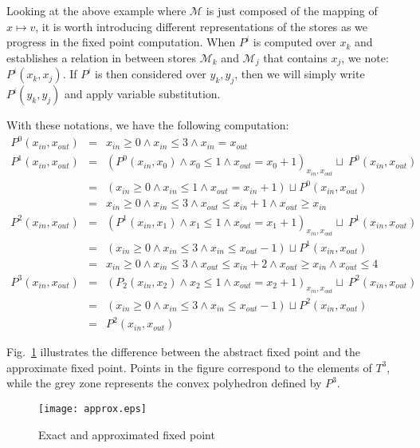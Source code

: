 \documentclass[submission,copyright,creativecommons]{eptcs}
\newcommand{\M}{\mathcal{M}}
\begin{document}
\noindent
Looking at the above example where $\M$ is just composed of the mapping of $x \mapsto v$, 
it is worth introducing different representations of the stores as we progress in the fixed point computation. 
When $P^i$ is computed over $x_k$ and establishes a relation in between stores $\M_k$ and $\M_j$ that contains $x_j$, we note: $P^i(x_k,x_j)$. If $P^i$ is then
considered over $y_k,y_j$, then we will simply write $P^i(y_k,y_j)$ and apply variable substitution. 

\noindent
With these notations, we have the following computation: 
\begin{eqnarray*}
 P^0(x_{in},x_{out}) &=&  x_{in} \geq 0 \land x_{in} \leq 3 \land x_{in} = x_{out} \\
 P^1(x_{in},x_{out}) &=& (P^0(x_{in},x_0) \land x_0 \leq 1 \land x_{out} = x_0 + 1)_{x_{in},x_{out}}
       \sqcup~P^0(x_{in},x_{out}) \\
    &=& (x_{in} \geq 0 \land x_{in} \leq 1 \land x_{out} = x_{in} + 1) \sqcup P^0(x_{in},x_{out}) \\
    &=& x_{in} \geq 0 \land x_{in} \leq 3  \land x_{out} \leq x_{in} + 1 \land  x_{out} \geq x_{in} \\
 P^2(x_{in},x_{out})  &=&  (P^1(x_{in},x_1) \land x_1 \leq 1 \land x_{out} = x_1 + 1)_{x_{in},x_{out}}
       \sqcup~P^1(x_{in},x_{out}) \\
    &=& (x_{in} \geq 0  \land x_{in} \leq  3 \land x_{in} \leq  x_{out} - 1) \sqcup P^1(x_{in},x_{out}) \\
    &=&  x_{in} \geq 0 \land x_{in} \leq 3  \land x_{out} \leq x_{in} + 2 \land  x_{out} \geq x_{in} \land x_{out} \leq 4\\
 P^3(x_{in},x_{out}) &=&  (P_2(x_{in},x_2) \land x_2 \leq 1 \land x_{out} = x_2 + 1)_{x_{in},x_{out}}
    \sqcup~P^2(x_{in},x_{out}) \\
 &=& (x_{in} \geq 0  \land x_{in} \leq  3 \land x_{in} \leq  x_{out} - 1) \sqcup P^2(x_{in},x_{out}) \\
 &=& P^2(x_{in},x_{out})
 \end{eqnarray*}

\noindent
Fig.~\ref{approx} illustrates the difference between the abstract fixed point and the approximate fixed point.
Points in the figure correspond to the elements of $T^3$, while the grey zone represents the convex polyhedron defined by $P^3$. 

\begin{figure}
\begin{center}
  \texttt{[image: approx.eps]}
\end{center}
\caption{Exact and approximated fixed point}
\label{approx}
\end{figure}
\end{document}
